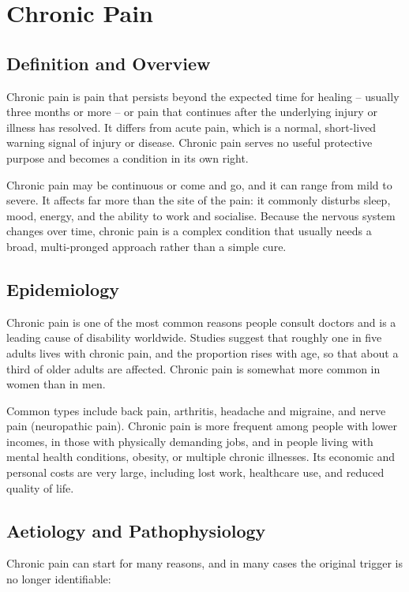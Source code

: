 \chapter{Chronic Pain}

\section*{Definition and Overview}
Chronic pain is pain that persists beyond the expected time for healing -- usually three months or more -- or pain that continues after the underlying injury or illness has resolved. It differs from acute pain, which is a normal, short-lived warning signal of injury or disease. Chronic pain serves no useful protective purpose and becomes a condition in its own right.

Chronic pain may be continuous or come and go, and it can range from mild to severe. It affects far more than the site of the pain: it commonly disturbs sleep, mood, energy, and the ability to work and socialise. Because the nervous system changes over time, chronic pain is a complex condition that usually needs a broad, multi-pronged approach rather than a simple cure.

\section*{Epidemiology}
Chronic pain is one of the most common reasons people consult doctors and is a leading cause of disability worldwide. Studies suggest that roughly one in five adults lives with chronic pain, and the proportion rises with age, so that about a third of older adults are affected. Chronic pain is somewhat more common in women than in men.

Common types include back pain, arthritis, headache and migraine, and nerve pain (neuropathic pain). Chronic pain is more frequent among people with lower incomes, in those with physically demanding jobs, and in people living with mental health conditions, obesity, or multiple chronic illnesses. Its economic and personal costs are very large, including lost work, healthcare use, and reduced quality of life.

\section*{Aetiology and Pathophysiology}
Chronic pain can start for many reasons, and in many cases the original trigger is no longer identifiable:

